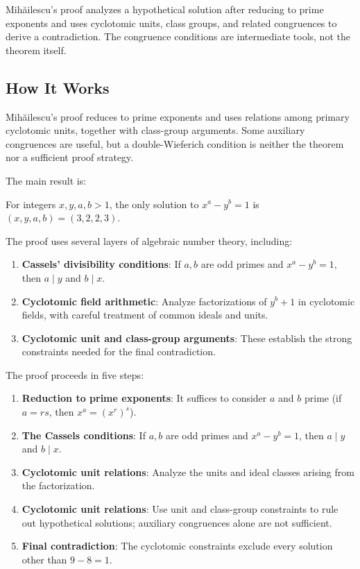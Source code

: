 Mihăilescu's proof analyzes a hypothetical solution after reducing to prime exponents and uses cyclotomic units, class groups, and related congruences to derive a contradiction. The congruence conditions are intermediate tools, not the theorem itself.

\subsection{How It Works}

Mihăilescu's proof reduces to prime exponents and uses relations among primary cyclotomic units, together with class-group arguments. Some auxiliary congruences are useful, but a double-Wieferich condition is neither the theorem nor a sufficient proof strategy.

The main result is:

\begin{theorem}[Mihăilescu]
For integers $x,y,a,b>1$, the only solution to $x^a-y^b=1$ is $(x,y,a,b)=(3,2,2,3)$.
\end{theorem}

The proof uses several layers of algebraic number theory, including:

\begin{enumerate}
\item \textbf{Cassels' divisibility conditions}: If $a, b$ are odd primes and $x^a - y^b = 1$, then $a \mid y$ and $b \mid x$.
\item \textbf{Cyclotomic field arithmetic}: Analyze factorizations of $y^b+1$ in cyclotomic fields, with careful treatment of common ideals and units.
\item \textbf{Cyclotomic unit and class-group arguments}: These establish the strong constraints needed for the final contradiction.
\end{enumerate}

The proof proceeds in five steps:

\begin{enumerate}
\item \textbf{Reduction to prime exponents}: It suffices to consider $a$ and $b$ prime (if $a = rs$, then $x^a = (x^r)^s$).
\item \textbf{The Cassels conditions}: If $a, b$ are odd primes and $x^a - y^b = 1$, then $a \mid y$ and $b \mid x$.
\item \textbf{Cyclotomic unit relations}: Analyze the units and ideal classes arising from the factorization.
\item \textbf{Cyclotomic unit relations}: Use unit and class-group constraints to rule out hypothetical solutions; auxiliary congruences alone are not sufficient.
\item \textbf{Final contradiction}: The cyclotomic constraints exclude every solution other than $9-8=1$.
\end{enumerate}

